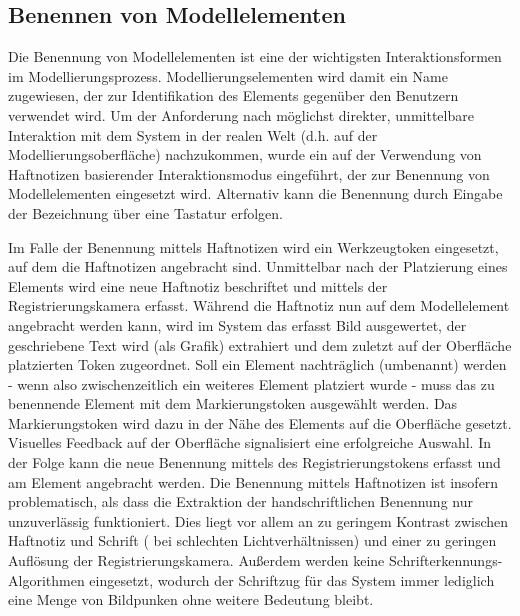 
\subsection{Benennen von Modellelementen} %
\label{sub:benennen_von_modellelementen}

Die Benennung von Modellelementen ist eine der wichtigsten Interaktionsformen im Modellierungsprozess. Modellierungselementen wird damit ein Name zugewiesen, der zur Identifikation des Elements gegenüber den Benutzern verwendet wird. Um der Anforderung nach möglichst direkter, unmittelbare Interaktion mit dem System in der realen Welt (d.h. auf der Modellierungsoberfläche) nachzukommen, wurde ein auf der Verwendung von Haftnotizen basierender Interaktionsmodus eingeführt, der zur Benennung von Modellelementen eingesetzt wird. Alternativ kann die Benennung durch Eingabe der Bezeichnung über eine Tastatur erfolgen.

Im Falle der Benennung mittels Haftnotizen wird ein Werkzeugtoken eingesetzt, auf dem die Haftnotizen angebracht sind. Unmittelbar nach der Platzierung eines Elements wird eine neue Haftnotiz beschriftet und mittels der Registrierungskamera erfasst. Während die Haftnotiz nun auf dem Modellelement angebracht werden kann, wird im System das erfasst Bild ausgewertet, der geschriebene Text wird (als Grafik) extrahiert und dem zuletzt auf der Oberfläche platzierten Token zugeordnet. Soll ein Element nachträglich (umbenannt) werden - wenn also zwischenzeitlich ein weiteres Element platziert wurde - muss das zu benennende Element mit dem Markierungstoken ausgewählt werden. Das Markierungstoken wird dazu in der Nähe des Elements auf die Oberfläche gesetzt. Visuelles Feedback auf der Oberfläche signalisiert eine erfolgreiche Auswahl. In der Folge kann die neue Benennung mittels des Registrierungstokens erfasst und am Element angebracht werden. Die Benennung mittels Haftnotizen ist insofern problematisch, als dass die Extraktion der handschriftlichen Benennung nur unzuverlässig funktioniert. Dies liegt vor allem an zu geringem Kontrast zwischen Haftnotiz und Schrift ( bei schlechten Lichtverhältnissen) und einer zu geringen Auflösung der Registrierungskamera. Außerdem werden keine Schrifterkennungs-Algorithmen eingesetzt, wodurch der Schriftzug für das System immer lediglich eine Menge von Bildpunken ohne weitere Bedeutung bleibt.


